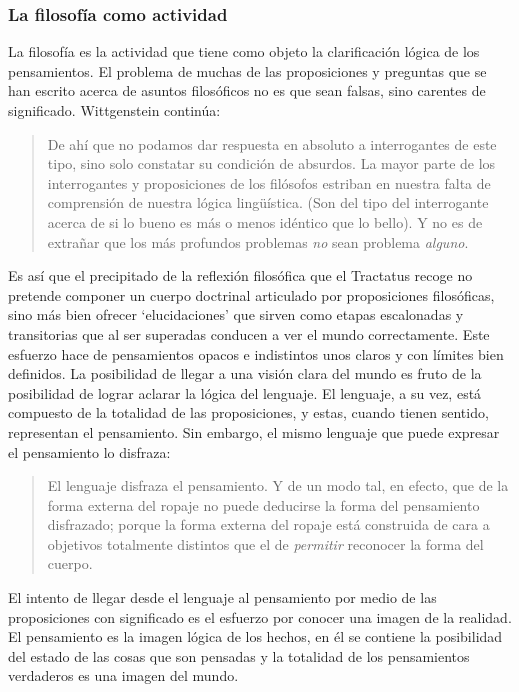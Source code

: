 \subsubsection{La filosofía como actividad}

La filosofía es la actividad que tiene como objeto la clarificación lógica de los pensamientos.\autocite[\S4.112]{wittgenstein1922tractatuses} El problema de muchas de las proposiciones y preguntas que se han escrito acerca de asuntos filosóficos no es que sean falsas, sino carentes de significado. Wittgenstein continúa: \blockquote[{\cite[\S4.003]{wittgenstein1922tractatuses}}]{De ahí que no podamos dar respuesta en absoluto a interrogantes de este tipo, sino solo constatar su condición de absurdos. La mayor parte de los interrogantes y proposiciones de los filósofos estriban en nuestra falta de comprensión de nuestra lógica lingüística. (Son del tipo del interrogante acerca de si lo bueno es más o menos idéntico que lo bello). Y no es de extrañar que los más profundos problemas \emph{no} sean problema \emph{alguno}.} Es así que el precipitado de la reflexión filosófica que el Tractatus recoge no pretende componer un cuerpo doctrinal articulado por proposiciones filosóficas, sino más bien ofrecer `elucidaciones' que sirven como etapas escalonadas y transitorias que al ser superadas conducen a ver el mundo correctamente. Este esfuerzo hace de pensamientos opacos e indistintos unos claros y con límites bien definidos.\autocite[Cf.~][\S4.112 y \S6.54]{wittgenstein1922tractatuses} La posibilidad de llegar a una visión clara del mundo es fruto de la posibilidad de lograr aclarar la lógica del lenguaje. El lenguaje, a su vez, está compuesto de la totalidad de las proposiciones, y estas, cuando tienen sentido, representan el pensamiento.\autocite[Cf.~][\S4 y \S4.001]{wittgenstein1922tractatuses} Sin embargo, el mismo lenguaje que puede expresar el pensamiento lo disfraza: \blockquote[{\cite[\S4.002]{wittgenstein1922tractatuses}}]{El lenguaje disfraza el pensamiento. Y de un modo tal, en efecto, que de la forma externa del ropaje no puede deducirse la forma del pensamiento disfrazado; porque la forma externa del ropaje está construida de cara a objetivos totalmente distintos que el de \emph{permitir} reconocer la forma del cuerpo.}

El intento de llegar desde el lenguaje al pensamiento por medio de las proposiciones con significado es el esfuerzo por conocer una imagen de la realidad. El pensamiento es la imagen lógica de los hechos, en él se contiene la posibilidad del estado de las cosas que son pensadas y la totalidad de los pensamientos verdaderos es una imagen del mundo.\autocite[Cf.~][\S3 y \S3.001]{wittgenstein1922tractatuses}

